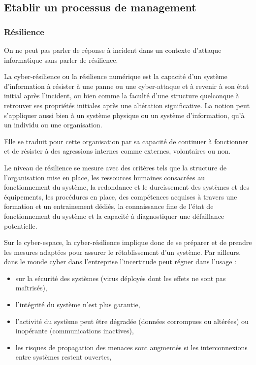 \subsection{Etablir un processus de management} 



\subsubsection{Résilience}
 
 On ne peut pas parler de réponse à incident dans un contexte d'attaque informatique sans parler de résilience.
 
La cyber-résilience ou la résilience numérique est la capacité d’un système d’information à résister à une panne ou une cyber-attaque et à revenir à son état initial après l’incident, ou bien comme la faculté d’une structure quelconque à retrouver ses propriétés initiales après une altération significative. La notion peut s’appliquer aussi bien à un système physique ou un système d'information, qu’à un individu ou une organisation. 

Elle se traduit pour cette organisation par sa capacité de continuer à fonctionner et de résister à des agressions internes comme externes, volontaires ou non.

 Le niveau de résilience se mesure  avec des critères tels que la structure de l’organisation mise en place, les ressources humaines consacrées au fonctionnement du système, la redondance et le durcissement des systèmes et des équipements, les procédures en place, des compétences acquises à travers une formation et un entrainement dédiés, la connaissance fine de l’état de fonctionnement du système et la capacité à diagnostiquer une défaillance potentielle.
 
Sur le cyber-espace, la cyber-résilience implique donc de se préparer et de prendre  les mesures adaptées pour assurer le rétablissement d’un système. Par  ailleurs, dans le monde cyber dans l'entreprise l’incertitude peut régner dans l'usage :
\begin{itemize}
  \item  sur la sécurité des systèmes (virus déployés dont les effets ne sont pas maîtrisés), 
   \item l’intégrité du système n’est plus garantie, 
  \item l’activité du système peut être dégradée (données corrompues ou altérées) ou inopérante (communications inactives), 
  \item les risques de propagation des menaces sont augmentés si les interconnexions entre systèmes restent ouvertes, 
    
\end{itemize}

